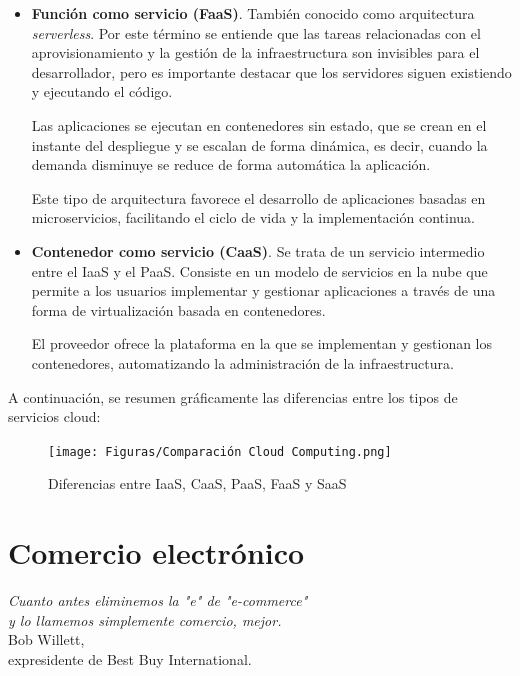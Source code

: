 \begin{itemize}
    \item \textbf{Función como servicio (FaaS)}. También conocido como arquitectura \textit{serverless}. Por este término se entiende que las tareas relacionadas con el aprovisionamiento y la gestión de la infraestructura son invisibles para el desarrollador, pero es importante destacar que los servidores siguen existiendo y ejecutando el código.
    
    Las aplicaciones se ejecutan en contenedores sin estado, que se crean en el instante del despliegue y se escalan de forma dinámica, es decir, cuando la demanda disminuye se reduce de forma automática la aplicación.
    
    Este tipo de arquitectura favorece el desarrollo de aplicaciones basadas en microservicios, facilitando el ciclo de vida y la implementación continua. 
    
    \item \textbf{Contenedor como servicio (CaaS)}. Se trata de un servicio intermedio entre el IaaS y el PaaS. Consiste  en un modelo de servicios en la nube que permite a los usuarios implementar y gestionar aplicaciones a través de una forma de virtualización basada en contenedores. 
    
    El proveedor ofrece la plataforma en la que se implementan y gestionan los contenedores, automatizando la administración de la infraestructura. 

\end{itemize}

\newpage

A continuación, se resumen gráficamente las diferencias entre los tipos de servicios cloud:
\begin{figure}[ht]
	\begin{center}
		\texttt{[image: Figuras/Comparación Cloud Computing.png]}
	\end{center}
	\caption{\label{fig:differentCloudComputing} Diferencias entre IaaS, CaaS, PaaS, FaaS y SaaS}
\end{figure}

\section{Comercio electrónico}

\begin{flushright}
\begin{minipage}[b][4cm][t]{11cm}
\begin{flushright}
{\small \emph{Cuanto antes eliminemos la "e" de "e-commerce"}} \vspace{-1pt} \\
{\small \emph{y lo llamemos simplemente comercio, mejor.}} \vspace{-1pt} \\
{\footnotesize Bob Willett,} \vspace{-1.5pt} \\
{\footnotesize expresidente de Best Buy International.\phantom{l}}
\end{flushright}
\end{minipage}
\end{flushright}

